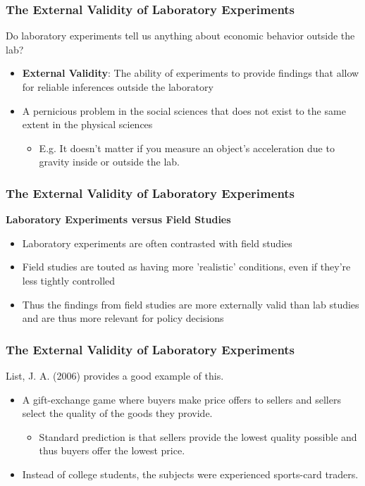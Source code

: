 \documentclass{beamer}
\begin{document}
\begin{frame}
	\frametitle{The External Validity of Laboratory Experiments}
	
	Do laboratory experiments tell us anything about economic behavior outside the lab? 
	
	\begin{itemize}
		\item \textbf{External Validity}: The ability of experiments to provide findings that allow for reliable inferences outside the laboratory
		\item A pernicious problem in the social sciences that does not exist to the same extent in the physical sciences
		\begin{itemize}
			\item E.g. It doesn't matter if you measure an object's acceleration due to gravity inside or outside the lab.
		\end{itemize}
	\end{itemize}
\end{frame}

\begin{frame}
	\frametitle{The External Validity of Laboratory Experiments}
	\textbf{Laboratory Experiments versus Field Studies}
	\begin{itemize}
		\item Laboratory experiments are often contrasted with field studies
		\item Field studies are touted as having more 'realistic' conditions, even if they're less tightly controlled
		\item Thus the findings from field studies are more externally valid than lab studies and are thus more relevant for policy decisions
	\end{itemize}

\end{frame}

\begin{frame}
	\frametitle{The External Validity of Laboratory Experiments}
	
	List, J. A. (2006) provides a good example of this.
	
	\begin{itemize}
		\item A gift-exchange game where buyers make price offers to sellers and sellers select the quality of the goods they provide.
		\begin{itemize}
			\item Standard prediction is that sellers provide the lowest quality possible and thus buyers offer the lowest price.
		\end{itemize}
		\item Instead of college students, the subjects were experienced sports-card traders.
		
	\end{itemize}
	
\end{frame}
\end{document}
